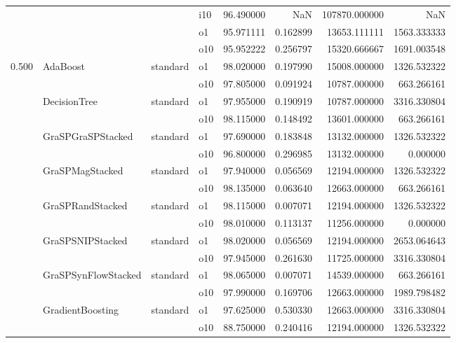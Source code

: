 \begin{longtable}{llllrrrr}
      &     &         & i10 &  96.490000 &        NaN &    107870.000000 &           NaN \\
      &     &         & o1 &  95.971111 &   0.162899 &     13653.111111 &   1563.333333 \\
      &     &         & o10 &  95.952222 &   0.256797 &     15320.666667 &   1691.003548 \\
0.500 & AdaBoost & standard & o1 &  98.020000 &   0.197990 &     15008.000000 &   1326.532322 \\
      &     &         & o10 &  97.805000 &   0.091924 &     10787.000000 &    663.266161 \\
      & DecisionTree & standard & o1 &  97.955000 &   0.190919 &     10787.000000 &   3316.330804 \\
      &     &         & o10 &  98.115000 &   0.148492 &     13601.000000 &    663.266161 \\
      & GraSPGraSPStacked & standard & o1 &  97.690000 &   0.183848 &     13132.000000 &   1326.532322 \\
      &     &         & o10 &  96.800000 &   0.296985 &     13132.000000 &      0.000000 \\
      & GraSPMagStacked & standard & o1 &  97.940000 &   0.056569 &     12194.000000 &   1326.532322 \\
      &     &         & o10 &  98.135000 &   0.063640 &     12663.000000 &    663.266161 \\
      & GraSPRandStacked & standard & o1 &  98.115000 &   0.007071 &     12194.000000 &   1326.532322 \\
      &     &         & o10 &  98.010000 &   0.113137 &     11256.000000 &      0.000000 \\
      & GraSPSNIPStacked & standard & o1 &  98.020000 &   0.056569 &     12194.000000 &   2653.064643 \\
      &     &         & o10 &  97.945000 &   0.261630 &     11725.000000 &   3316.330804 \\
      & GraSPSynFlowStacked & standard & o1 &  98.065000 &   0.007071 &     14539.000000 &    663.266161 \\
      &     &         & o10 &  97.990000 &   0.169706 &     12663.000000 &   1989.798482 \\
      & GradientBoosting & standard & o1 &  97.625000 &   0.530330 &     12663.000000 &   3316.330804 \\
      &     &         & o10 &  88.750000 &   0.240416 &     12194.000000 &   1326.532322 \\

\end{longtable}
